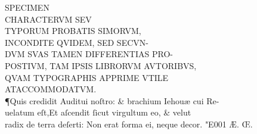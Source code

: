\documentclass[letterpaper]{article}
\begin{document}
\centering
{{
		\fontsize{19}{16}\selectfont  SPECIMEN \\
		\fontsize{41}{33}\selectfont CHARACTERVM SEV \\
		\fontsize{23}{25}\selectfont TYPORUM PROBATIS SIMORVM\kern-3pt, \\
		\fontsize{19}{17}\selectfont INCONDITE QVIDEM, SED SECVN\kern-3pt-\\
		\fontsize{14}{16}\selectfont DVM SVAS TAMEN DIFFERENTIAS PRO\kern-2pt- \\
		\fontsize{9.5}{11.5}\selectfont POSTIVM, TAM IPSIS LIBRORVM AVTORIBVS\kern-2pt,\\
		\fontsize{7}{9}\selectfont QVAM TYPOGRAPHIS APPRIME VTILE\\
		\fontsize{5}{4}\selectfont AT\quad ACCOMMODATVM.\\}
\justifying
\huge
\noindent \P \quad Quis credidit Auditui noſtro: \& brachium Iehou\ae{} cui Re-\\
uelatum eſt,Et aſcendit ſicut virgultum  eo, \& velut\\
radix de terra deſerti: Non erat forma ei, neque decor. \char"E001{} \AE{}. \OE .

}
\end{document}
